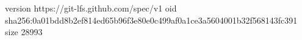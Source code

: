 version https://git-lfs.github.com/spec/v1
oid sha256:0a01bdd8b2ef814ed65b96f3e80e0c499af0a1ce3a5604001b32f568143fc391
size 28993
